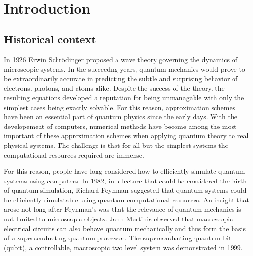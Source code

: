 \chapter{Introduction}\label{ch:introduction}
\section{Historical context}

In 1926 Erwin Schr\"odinger proposed a wave theory governing the dynamics of microscopic systems.\cite{Schrodinger1926}
In the succeedng years, quantum mechanics would prove to be extraordinarily accurate in predicting the subtle and surprising behavior of electrons, photons, and atoms alike.
Despite the success of the theory,
the resulting equations developed a reputation for being unmanagable with only the simplest cases being exactly solvable.
For this reason, approximation schemes have been an essential part of quantum physics since the early days.  %
With the developement of computers,
numerical methods have become among the most important of these approximation schemes when applying quantum theory to real physical systems.
The challenge is that for all but the simplest systems the computational resources required are immense.

For this reason, people have long considered how to efficiently simulate quantum systems using computers.
In 1982, in a lecture that could be considered the birth of quantum simulation,
Richard Feynman suggested that quantum systems could be efficiently simulatable using quantum computational resources.\cite{Feynman1982}
An insight that arose not long after Feynman's was that the relevance of quantum mechanics is not limited to microscopic objects.
John Martinis observed that macroscopic electrical circuits can also behave quantum mechanically and thus form the basis of a superconducting quantum processor.\cite{Martinis1985}
The superconducting quantum bit (qubit), a controllable, macroscopic two level system was demonstrated in 1999. \cite{Nakamura1999}

